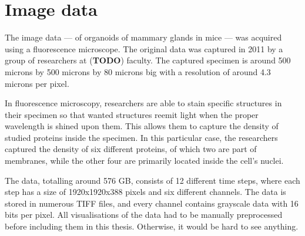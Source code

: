 \documentclass[
  digital,     %
  oneside,     %
  nosansbold,  %
  nocolorbold, %
  lof,         %
  lot,         %
]{fithesis4}
\begin{document}
\chapter{Image data}

The image data --- of organoids of mammary glands in mice --- was acquired using
a fluorescence microscope. The original data was captured in 2011 by a group of
researchers at (\textbf{TODO}) faculty. The captured specimen is around 500
microns by 500 microns by 80 microns big with a resolution of around 4.3 microns
per pixel.

In fluorescence microscopy, researchers are able to stain specific structures in
their specimen so that wanted structures reemit light when the proper wavelength
is shined upon them. This allows them to capture the density of studied proteins
inside the specimen. In this particular case, the researchers captured the
density of six different proteins, of which two are part of membranes, while the
other four are primarily located inside the cell's nuclei.

The data, totalling around 576 GB, consists of 12 different time steps, where
each step has a size of 1920x1920x388 pixels and six different channels. The
data is stored in numerous TIFF files, and every channel contains grayscale data
with 16 bits per pixel. All visualisations of the data had to be manually
preprocessed before including them in this thesis. Otherwise, it would be hard
to see anything.
\end{document}
